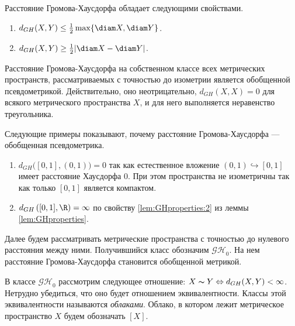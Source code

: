 \begin{lemma}
  \label{lem:GHproperties}
  Расстояние Громова-Хаусдорфа обладает следующими свойствами.
  \begin{enumerate}
    \item \( d_{GH}(X,Y) \le \frac{1}{2}\max\{\diam X, \diam Y\} \).
    \item \( d_{GH}(X,Y) \ge \frac{1}{2} | \diam X - \diam Y |\).
      \label{lem:GHproperties:2}
  \end{enumerate}
\end{lemma}
Расстояние Громова-Хаусдорфа на собственном классе всех метрических
пространств, рассматриваемых с точностью до изометрии является
обобщенной псевдометрикой. Действительно, оно неотрицательно, \(
d_{GH}(X,X) = 0 \) для всякого метрического пространства \( X \), и
для него выполняется неравенство треугольника.
\begin{example} Следующие примеры показывают, почему расстояние
  Громова-Хаусдорфа --- обобщенная псевдометрика.
  \begin{enumerate}
    \item \( d_{GH}\big([0,1],(0,1)\big) =0\) так как естественное
      вложение \( (0,1) \hookrightarrow [0,1] \) имеет расстояние
      Хаусдорфа \( 0 \). При этом пространства не изометричны так как
      только \( [0,1] \) является компактом.
    \item \( d_{GH}\left([0,1], \R\right)  = \infty\) по свойству
      \ref{lem:GHproperties:2} из леммы \ref{lem:GHproperties}.
  \end{enumerate}
\end{example}
Далее будем рассматривать метрические пространства с точностью до
нулевого расстояния между ними. Получившийся класс обозначим \(
\mathcal{GH}_0 \). На нем расстояние Громова-Хаусдорфа становится
обобщенной метрикой.

\begin{definition} В классе $\mathcal{GH}_{0}$
  рассмотрим следующее
  отношение: $X \thicksim Y \Leftrightarrow d_{GH}(X, Y) < \infty$. Нетрудно
  убедиться, что оно будет отношением эквивалентности. Классы этой
  эквивалентности
  называются \emph{облаками}. Облако, в котором лежит метрическое
  пространство $X$
  будем обозначать $[X]$.
\end{definition}

